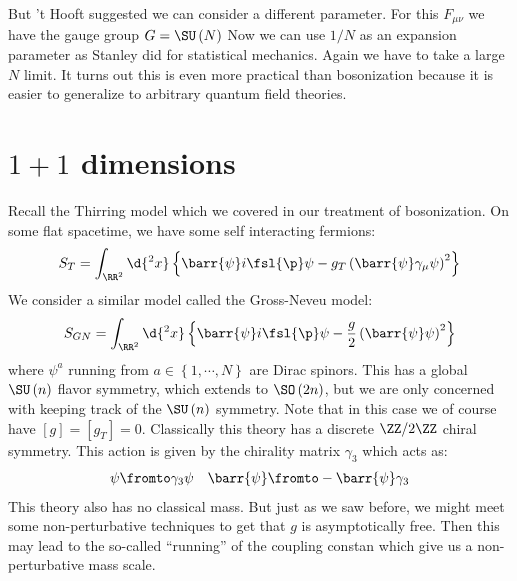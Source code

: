 \documentclass{booc}
\begin{document}
But 't Hooft suggested we can consider a different parameter. 
For this $F_{\mu\nu}$ we have the gauge group $G = \SU\left( N \right)$
Now we can use $1/ N$ as an expansion parameter as Stanley did for statistical mechanics.
Again we have to take a large $N$ limit. 
It turns out this is even more practical than bosonization because it
is easier to generalize to arbitrary quantum field theories.

\section{\texorpdfstring{$1+1$}{1+1} dimensions}

Recall the Thirring model which we covered in our treatment of bosonization. 
On some flat spacetime, we have some self interacting fermions:
\begin{equation}
S_T = \int_{\RR^2} \d{^2 x} \left\{ 
\barr{\psi} i \fsl{\p} \psi - g_T\left( \barr{\psi} \gamma_\mu \psi \right)^2\right\}
\end{equation}
We consider a similar model called the Gross-Neveu model:
\begin{equation}
S_{GN} = \int_{\RR^2} \d{^2 x} \left\{ 
\barr{\psi} i \fsl{\p} \psi - \frac{g}{2} \left( \barr{\psi}\psi \right)^2\right\}
\end{equation}
where $\psi^a$ running from $a\in \left\{ 1, \cdots , N \right\}$ are Dirac spinors. 
This has a global $\SU\left( n \right)$ flavor symmetry, which extends to $\SO\left( 2n \right)$,
but we are only concerned with keeping track of the $\SU\left( n \right)$ symmetry. 
Note that in this case we of course have $\left[ g \right] = \left[ g_T \right] = 0$.
Classically this theory has a discrete $\ZZ / 2\ZZ$ chiral symmetry. 
This action is given by the chirality matrix $\gamma_3$ which acts as:
\begin{align}
\psi \fromto \gamma_3 \psi
&&
\barr{\psi} \fromto -\barr{\psi}\gamma_3
\end{align}
This theory also has no classical mass. 
But just as we saw before, we might meet some non-perturbative techniques to get that
$g$ is asymptotically free.
Then this may lead to the so-called ``running'' of the coupling constan which give us
a non-perturbative mass scale.
\end{document}
